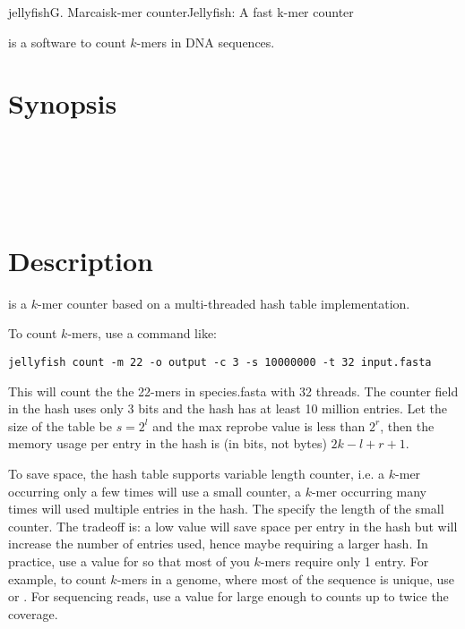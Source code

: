 \documentclass[english]{article}
\newcommand{\ddash}[1]{-\,-#1}
\newcommand{\LoOpt}[1]{\oOpt{\ddash{#1}}}
\begin{document}
\begin{Name}{1}{jellyfish}{G. Marcais}{k-mer counter}{Jellyfish: A fast k-mer counter}

 is a software to count $k$-mers in DNA sequences.

\end{Name}

\section{Synopsis}
     \LoOpt{both-strands}   \\
   \Dots \\
 \LoOpt{fasta}   \\
     \\
 

\section{Description}

 is a $k$-mer counter based on a multi-threaded hash
table implementation.

To count $k$-mers, use a command like:

\begin{verbatim}
jellyfish count -m 22 -o output -c 3 -s 10000000 -t 32 input.fasta
\end{verbatim}

This will count the the 22-mers in species.fasta with 32 threads. The
counter field in the hash uses only 3 bits and the hash has at least
10 million entries. Let the size of the table be $s=2^l$ and the max
reprobe value is less than $2^r$, then the memory usage per entry in the hash is (in bits, not bytes) $2k-l+r+1$.

To save space, the hash table supports variable length counter, i.e. a
$k$-mer occurring only a few times will use a small counter, a $k$-mer
occurring many times will used multiple entries in the hash. The
 specify the length of the small counter. The tradeoff is: a
low value will save space per entry in the hash but will increase the
number of entries used, hence maybe requiring a larger hash. In
practice, use a value for  so that most of you $k$-mers
require only 1 entry. For example, to count $k$-mers in a genome,
where most of the sequence is unique, use  or
. For sequencing reads, use a value for
 large enough to counts up to twice the coverage.
\end{document}
